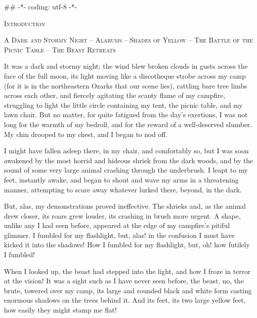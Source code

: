 ## -*- coding: utf-8 -*-
\newpage
{}
\pagestyle{fancy}
\fancyhf{}
\fancyfoot[LE,RO]{\thepage}
\begin{center}
\par
\textsc{Introduction}
\par
\textsc{A Dark and Stormy Night – Alarums – Shades of Yellow – The Battle of the Picnic Table – The Beast Retreats}
\end{center}
\par
It was a dark and stormy night; the wind blew broken clouds in gusts across the face of the full moon, its light moving like a discotheque strobe across my camp (for it is in the northeastern Ozarks that our scene lies), rattling bare tree limbs across each other, and fiercely agitating the scanty flame of my campfire, struggling to light the little circle containing my tent, the picnic table, and my lawn chair.  But no matter, for  quite fatigued from the day's exertions, I was not long for the warmth of my bedroll, and for the reward of a well-deserved slumber.  My chin drooped to my chest, and I began to nod off.
\par
I might have fallen asleep there, in my chair, and comfortably so, but I was soon awakened by the most horrid and hideous shriek from the dark woods, and by the sound of some very large animal crashing through the underbrush.  I leapt to my feet, instantly awake, and began to shout and wave my arms in a threatening manner, attempting to scare away whatever lurked there, beyond, in the dark.
\par
But, alas, my demonstrations proved ineffective.  The shrieks and, as the animal drew closer, its roars grew louder, its crashing in brush more urgent.  A shape, unlike any I had seen before, appeared at the edge of my campfire's pitiful glimmer.  I fumbled for my flashlight, but, alas! in the confusion I must have kicked it into the shadows!  How I fumbled for my flashlight, but, oh! how futilely I fumbled!
\par
When I looked up, the beast had stepped into the light, and how I froze in terror at the vision!  It was a sight such as I have never seen before, the beast, no, the brute, towered over my camp, its large and rounded black and white form casting enormous shadows on the trees behind it.  And its feet, its two large yellow feet, how easily they might stamp me flat!
